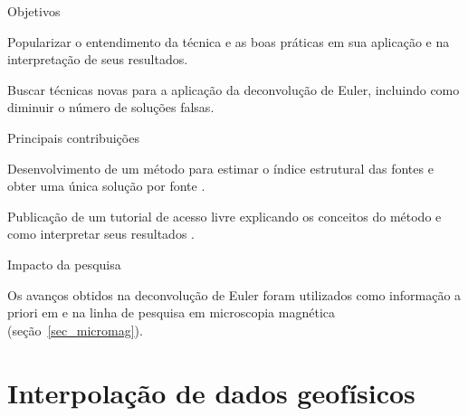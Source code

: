 \documentclass[12pt,a4paper,oneside]{book}
\begin{document}
\begin{fancyenum}{\faBullseye}{Objetivos}
  \item Popularizar o entendimento da técnica e as boas práticas em sua
    aplicação e na interpretação de seus resultados.
  \item Buscar técnicas novas para a aplicação da deconvolução de Euler,
    incluindo como diminuir o número de soluções falsas.
\end{fancyenum}
\begin{fancyenum}{\faLightbulb}{Principais contribuições}
  \item Desenvolvimento de um método para estimar o índice estrutural das
    fontes e obter uma única solução por fonte \citep{Melo2013}.
  \item Publicação de um tutorial de acesso livre explicando os conceitos do
    método e como interpretar seus resultados \citep{Uieda2014}.
\end{fancyenum}
\begin{fancyenum}{\faRocket}{Impacto da pesquisa}
  \item Os avanços obtidos na deconvolução de Euler foram utilizados
    como informação a priori em \citet{OliveiraJr2015} e na linha de pesquisa
    em microscopia magnética (seção~\ref{sec_micromag}).
\end{fancyenum}



\section{Interpolação de dados geofísicos}
\end{document}
